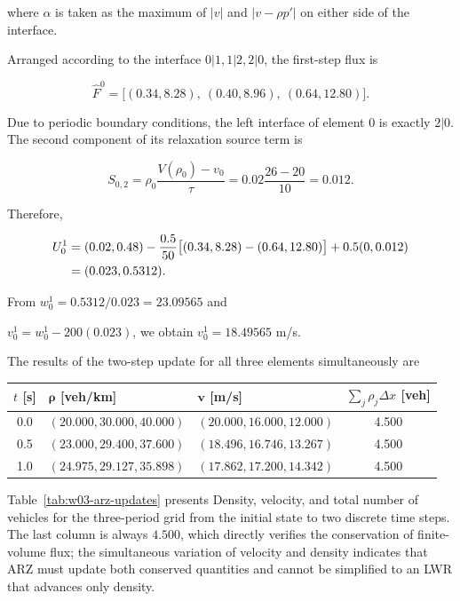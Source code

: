 \documentclass[11pt,a4paper,openany]{book}
\numberwithin{equation}{chapter}
\numberwithin{figure}{chapter}
\numberwithin{table}{chapter}
\newcommand{\tabletext}[2]{%
  \par\smallskip\noindent
  Table~\ref{#1} presents #2
\par\smallskip
}
\begin{document}
where $\alpha$ is taken as the maximum of $|v|$ and $|v-\rho p'|$ on either side of the interface.

Arranged according to the interface $0|1,1|2,2|0$, the first-step flux is

\begin{equation}
\widehat F^0=
\bigl[(0.34,8.28),\ (0.40,8.96),\ (0.64,12.80)\bigr].
\label{eq:w03-first-flux}
\end{equation}

Due to periodic boundary conditions, the left interface of element 0 is exactly $2|0$. The second component of its relaxation source term is

\[
S_{0,2}=\rho_0\frac{V(\rho_0)-v_0}{\tau}
=0.02\frac{26-20}{10}=0.012.
\]

Therefore,

\begin{align}
U_0^1
&=(0.02,0.48)-\frac{0.5}{50}
\bigl[(0.34,8.28)-(0.64,12.80)\bigr]
+0.5(0,0.012)\notag\\
&=(0.023,0.5312).
\label{eq:w03-cell0-update}
\end{align}

From $w_0^1=0.5312/0.023=23.09565$ and

$v_0^1=w_0^1-200(0.023)$, we obtain $v_0^1=18.49565$ m/s.

The results of the two-step update for all three elements simultaneously are







\begin{center}
\small
{}
\label{tab:w03-arz-updates}
\begin{tabular}{c p{4.7cm} p{4.7cm} c}
\toprule
$t$ [s] & $\bm\rho$ [veh/km] & $\bm v$ [m/s] & $\sum_j\rho_j\Delta x$ [veh]\\
\midrule
0.0 & $(20.000,30.000,40.000)$ & $(20.000,16.000,12.000)$ & 4.500\\
0.5 & $(23.000,29.400,37.600)$ & $(18.496,16.746,13.267)$ & 4.500\\
1.0 & $(24.975,29.127,35.898)$ & $(17.862,17.200,14.342)$ & 4.500\\
\bottomrule
\end{tabular}
\end{center}
\tabletext{tab:w03-arz-updates}{Density, velocity, and total number of vehicles for the three-period grid from the initial state to two discrete time steps. The last column is always $4.500$, which directly verifies the conservation of finite-volume flux; the simultaneous variation of velocity and density indicates that ARZ must update both conserved quantities and cannot be simplified to an LWR that advances only density.
}
\end{document}
